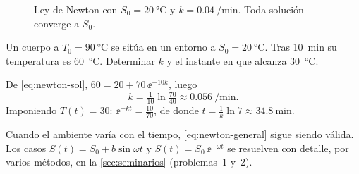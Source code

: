 \begin{figure}[H]
  \centering
  \caption{Ley de Newton con $S_0=\SI{20}{\celsius}$ y $k=\SI{0,04}{\per\minute}$. Toda solución converge a $S_0$.}
  \label{fig:newton}
\end{figure}

\begin{example}
Un cuerpo a $T_0=\SI{90}{\celsius}$ se sitúa en un entorno a $S_0=\SI{20}{\celsius}$. Tras \SI{10}{\minute} su temperatura es \SI{60}{\celsius}. Determinar $k$ y el instante en que alcanza \SI{30}{\celsius}.

De \eqref{eq:newton-sol}, $60 = 20 + 70\,\ee^{-10k}$, luego
\[
  k = \tfrac{1}{10}\ln\tfrac{70}{40} \approx \SI{0,056}{\per\minute}.
\]
Imponiendo $T(t)=30$: $\ee^{-kt}=\tfrac{10}{70}$, de donde
$t = \tfrac{1}{k}\ln 7 \approx \SI{34,8}{\minute}$.\finejemplo
\end{example}

Cuando el ambiente varía con el tiempo, \eqref{eq:newton-general} sigue siendo válida. Los casos $S(t)=S_0+b\sin\omega t$ y $S(t)=S_0\,\ee^{-\omega t}$ se resuelven con detalle, por varios métodos, en la \cref{sec:seminarios} (problemas~1 y~2).

\newpage
